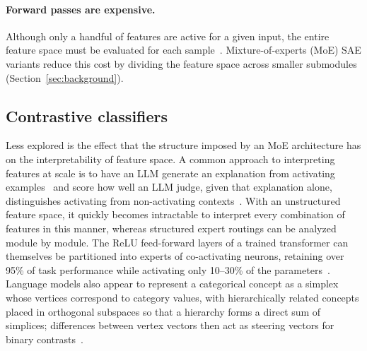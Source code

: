 \paragraph{Forward passes are expensive.}
Although only a handful of features are active for a given input, the
entire feature space must be evaluated for each
sample~\cite{gao2024,mudide2025}. Mixture-of-experts (MoE) SAE variants
reduce this cost by dividing the feature space across smaller submodules
(Section~\ref{sec:background}).

\subsection{Contrastive classifiers}

Less explored is the effect that the structure imposed by an MoE
architecture has on the interpretability of feature space. A common
approach to interpreting features at scale is to have an LLM generate an
explanation from activating examples~\cite{bills2023} and score how well
an LLM judge,
given that explanation alone, distinguishes activating from
non-activating contexts~\cite{paulo2025}. With an unstructured feature
space, it quickly becomes intractable to interpret every combination of
features in this manner, whereas structured expert routings can be
analyzed module by module. The ReLU feed-forward layers of a trained
transformer can themselves be partitioned into experts of co-activating
neurons, retaining over 95\% of task performance while activating only
10--30\% of the parameters~\cite{zhang2022}. Language models also appear
to represent a categorical concept as a simplex whose vertices correspond
to category values, with hierarchically related concepts placed in
orthogonal subspaces so that a hierarchy forms a direct sum of simplices;
differences between vertex vectors then act as steering vectors for
binary contrasts~\cite{park2025}.

